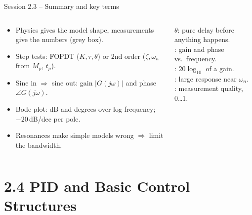 \documentclass[aspectratio=169,10pt]{beamer}
\begin{document}
\begin{frame}{Session 2.3 -- Summary and key terms}
\begin{columns}[T]
\begin{keybox}
\footnotesize
\begin{itemize}
  \item Physics gives the model shape, measurements give the numbers (grey box).
  \item Step tests: FOPDT ($K,\tau,\theta$) or 2nd order ($\zeta,\omega_n$ from $M_p$, $t_p$).
  \item Sine in $\Rightarrow$ sine out: gain $|G(j\omega)|$ and phase $\angle G(j\omega)$.
  \item Bode plot: dB and degrees over log frequency; $-20$\,dB/dec per pole.
  \item Resonances make simple models wrong $\Rightarrow$ limit the bandwidth.
\end{itemize}
\end{keybox}
\begin{defbox}
\footnotesize
{} $\theta$: pure delay before anything happens.\\
: gain and phase vs.\ frequency.\\
: $20\log_{10}$ of a gain.\\
: large response near $\omega_n$.\\
: measurement quality, 0\ldots1.
\end{defbox}
\end{columns}
\end{frame}

\section{2.4 PID and Basic Control Structures}
\end{document}
